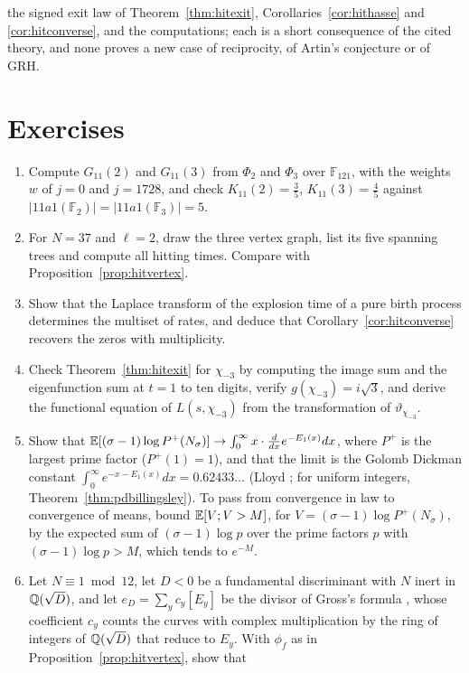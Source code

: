 the signed exit law of Theorem~\ref{thm:hitexit}, Corollaries~\ref{cor:hithasse} and \ref{cor:hitconverse}, and the computations; each is a short consequence of the cited theory, and none proves a new case of reciprocity, of Artin's conjecture or of GRH.

\section{Exercises}

\begin{enumerate}
\item Compute $G_{11}(2)$ and $G_{11}(3)$ from $\Phi_2$ and $\Phi_3$ over $\mathbb F_{121}$, with the weights $w$ of $j=0$ and $j=1728$, and check $K_{11}(2)=\frac35$, $K_{11}(3)=\frac45$ against $|11a1(\mathbb F_2)|=|11a1(\mathbb F_3)|=5$.
\item For $N=37$ and $\ell=2$, draw the three vertex graph, list its five spanning trees and compute all hitting times. Compare with Proposition~\ref{prop:hitvertex}.
\item Show that the Laplace transform of the explosion time of a pure birth process determines the multiset of rates, and deduce that Corollary~\ref{cor:hitconverse} recovers the zeros with multiplicity.
\item Check Theorem~\ref{thm:hitexit} for $\chi_{-3}$ by computing the image sum and the eigenfunction sum at $t=1$ to ten digits, verify $g(\chi_{-3})=i\sqrt3$, and derive the functional equation of $L(s,\chi_{-3})$ from the transformation of $\vartheta_{\chi_{-3}}$.
\item Show that $\mathbb{E}[(\sigma-1)\log P^+(N_\sigma)]\to\int_0^\infty x\cdot\frac{d}{dx}e^{-E_1(x)}dx$, where $P^+$ is the largest prime factor ($P^+(1)=1$), and that the limit is the Golomb Dickman constant $\int_0^\infty e^{-x-E_1(x)}dx=0.62433\ldots$ (Lloyd \cite{lloyd1984}; for uniform integers, Theorem~\ref{thm:pdbillingsley}). To pass from convergence in law to convergence of means, bound $\mathbb{E}[V;V>M]$, for $V=(\sigma-1)\log P^+(N_\sigma)$, by the expected sum of $(\sigma-1)\log p$ over the prime factors $p$ with $(\sigma-1)\log p>M$, which tends to $e^{-M}$.
\item\label{ex:hitgross} Let $N\equiv1\bmod12$, let $D<0$ be a fundamental discriminant with $N$ inert in $\mathbb{Q}(\sqrt D)$, and let $e_D=\sum_yc_y[E_y]$ be the divisor of Gross's formula \cite{gross1987}, whose coefficient $c_y$ counts the curves with complex multiplication by the ring of integers of $\mathbb{Q}(\sqrt D)$ that reduce to $E_y$. With $\phi_f$ as in Proposition~\ref{prop:hitvertex}, show that

\end{enumerate}
